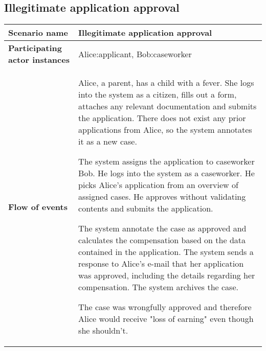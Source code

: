 \subsection*{Illegitimate application approval}
\begin{table}[htb!]
\begin{tabularx}{\textwidth}{l|X}
	\textbf{Scenario name} &  Illegitimate application approval\\
	\hline
	\textbf{Participating actor instances} & Alice:applicant, Bob:caseworker\\
	\hline
	\textbf{Flow of events} &
	\begin{compactenum}
	        \item Alice, a parent, has a child with a fever. She logs into the system as a citizen, fills out a form, attaches any relevant documentation and submits the application. There does not exist any prior applications from Alice, so the system annotates it as a new case.
	        \item The system assigns the application to caseworker Bob. He logs into the system as a caseworker. He picks Alice's application from an overview of assigned cases. He approves without validating contents and submits the application.
            \item The system annotate the case as approved and calculates the compensation based on the data contained in the application. The system sends a response to Alice's e-mail that her application was approved, including the details regarding her compensation. The system archives the case.
            \item The case was wrongfully approved and therefore Alice would receive "loss of earning" even though she shouldn't.
	\end{compactenum}\\
	\hline
\end{tabularx}
\end{table}

\newpage
